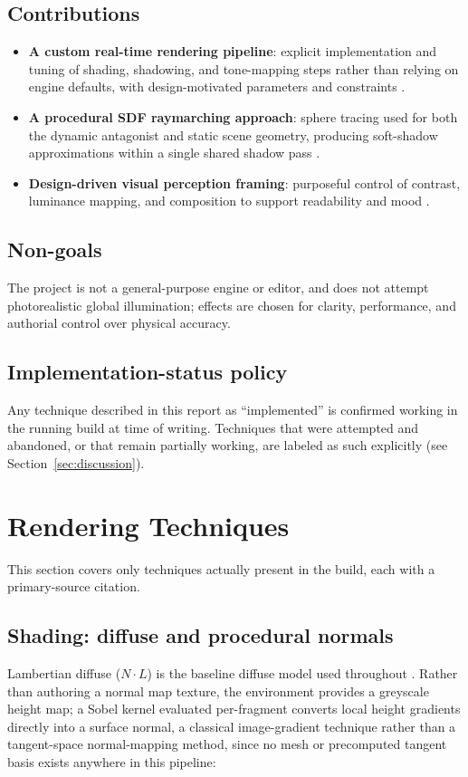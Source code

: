 \documentclass[conference]{IEEEtran}
\begin{document}
\subsection{Contributions}
\begin{itemize}
  \item \textbf{A custom real-time rendering pipeline}: explicit implementation and tuning of shading, shadowing, and tone-mapping steps rather than relying on engine defaults, with design-motivated parameters and constraints \cite{akenine2018realtime,reinhard2002tonereproduction}.
  \item \textbf{A procedural SDF raymarching approach}: sphere tracing used for both the dynamic antagonist and static scene geometry, producing soft-shadow approximations within a single shared shadow pass \cite{hart1996spheretracing,quilez2010softshadows}.
  \item \textbf{Design-driven visual perception framing}: purposeful control of contrast, luminance mapping, and composition to support readability and mood \cite{reinhard2002tonereproduction,arnheim1954art}.
\end{itemize}

\subsection{Non-goals}
The project is not a general-purpose engine or editor, and does not attempt photorealistic global illumination; effects are chosen for clarity, performance, and authorial control over physical accuracy.

\subsection{Implementation-status policy}
Any technique described in this report as ``implemented'' is confirmed working in the running build at time of writing. Techniques that were attempted and abandoned, or that remain partially working, are labeled as such explicitly (see Section~\ref{sec:discussion}).

\section{Rendering Techniques}
This section covers only techniques actually present in the build, each with a primary-source citation.

\subsection{Shading: diffuse and procedural normals}
Lambertian diffuse ($N\cdot L$) is the baseline diffuse model used throughout \cite{akenine2018realtime}. Rather than authoring a normal map texture, the environment provides a greyscale height map; a Sobel kernel evaluated per-fragment converts local height gradients directly into a surface normal, a classical image-gradient technique rather than a tangent-space normal-mapping method, since no mesh or precomputed tangent basis exists anywhere in this pipeline:
\end{document}

